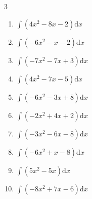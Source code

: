 \begin{multicols}{3}
\begin{enumerate}

\columnbreak %

\resetques

  \item $\displaystyle \int \left( 4x^{2}-8x-2 \right) \mathrm{d}x$


  \item $\displaystyle \int \left( -6x^{2}-x-2 \right) \mathrm{d}x$


  \item $\displaystyle \int \left( -7x^{2}-7x+3 \right) \mathrm{d}x$


  \item $\displaystyle \int \left( 4x^{2}-7x-5 \right) \mathrm{d}x$


  \item $\displaystyle \int \left( -6x^{2}-3x+8 \right) \mathrm{d}x$


  \item $\displaystyle \int \left( -2x^{2}+4x+2 \right) \mathrm{d}x$


  \item $\displaystyle \int \left( -3x^{2}-6x-8 \right) \mathrm{d}x$


  \item $\displaystyle \int \left( -6x^{2}+x-8 \right) \mathrm{d}x$


  \item $\displaystyle \int \left( 5x^{2}-5x \right) \mathrm{d}x$


  \item $\displaystyle \int \left( -8x^{2}+7x-6 \right) \mathrm{d}x$


\end{enumerate}
\end{multicols}
